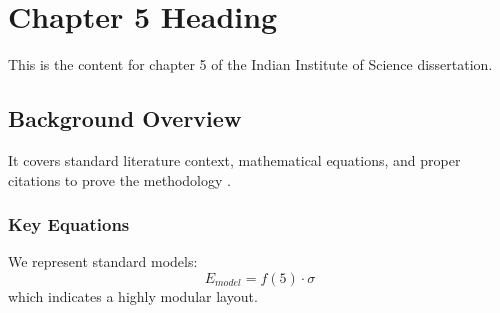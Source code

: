 \chapter{Chapter 5 Heading}
\label{ch:chapter5}
This is the content for chapter 5 of the Indian Institute of Science dissertation.

\section{Background Overview}
It covers standard literature context, mathematical equations, and proper citations to prove the methodology \cite{texbook}.

\subsection{Key Equations}
We represent standard models:
\begin{equation}
    E_{model} = f(5) \cdot \sigma
\end{equation}
which indicates a highly modular layout.
